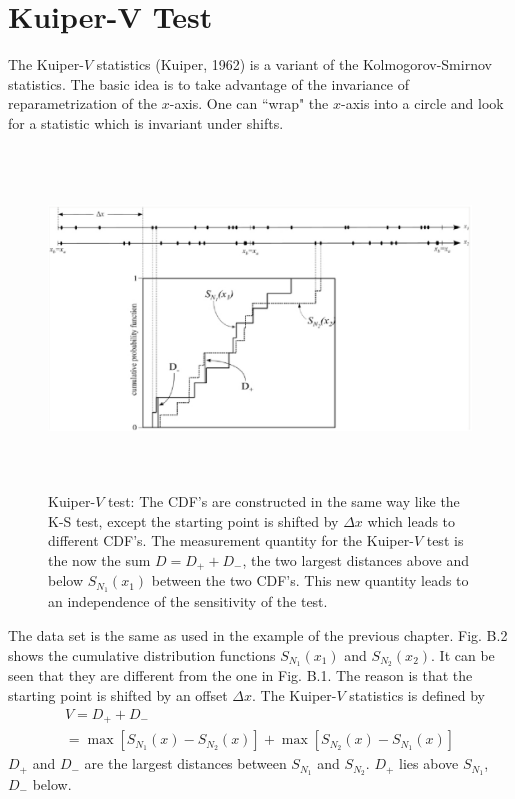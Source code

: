 \section{Kuiper-V Test}\label{kvtest}
The Kuiper-$V$ statistics (Kuiper, 1962) is a variant of the
Kolmogorov-Smirnov statistics. The basic idea is to take advantage
of the invariance of reparametrization of the $x$-axis. One can
``wrap" the $x$-axis into a circle  and look
for a statistic which is invariant under shifts.
\begin{figure}[h]\label{kv}
   \centering
   \includegraphics[height=9cm]{kuiper.eps}
   \caption{Kuiper-$V$ test: The CDF's are
   constructed in the same way like the K-S test, except the starting
   point is shifted by $\Delta x$ which leads to different CDF's. The measurement
   quantity for the Kuiper-$V$ test is the now the sum $D=D_++D_-$, the two largest
   distances above and below $S_{N_1}(x_1)$ between the two CDF's. This new quantity leads to an independence of
   the sensitivity of the test.}
\end{figure}
The data set is the same as used in the example of the previous
chapter. Fig. B.2 shows the cumulative distribution functions
$S_{N_1}(x_1)$ and $S_{N_2}(x_2)$. It can be seen that they are
different from the one in Fig. B.1. The reason is that the starting
point is shifted by an offset $\Delta x$. The Kuiper-$V$
statistics is defined by
\begin{equation}
\begin{array}{l}
    V=D_++D_-
    \\=\max[S_{N_1}(x)-S_{N_2}(x)]+\max[S_{N_2}(x)-S_{N_1}(x)]
\end{array}
\end{equation}
$D_+$ and $D_-$ are the largest distances between $S_{N_1}$ and
$S_{N_2}$. $D_+$ lies above $S_{N_1}$, $D_-$ below.

